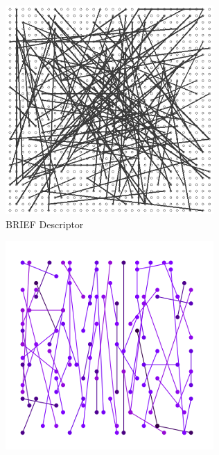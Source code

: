 \begin{figure}[htp]
  \centering
  \begin{subfigure}[t]{0.31\textwidth}
    \centering
    \includegraphics[width=\linewidth]{images/feature/brief.png}
    \caption{BRIEF Descriptor~\cite{Calonder2012}}
  \end{subfigure}
  \begin{subfigure}[t]{0.33\textwidth}
    \centering
    \includegraphics[width=\linewidth]{images/feature/orb.png}

\end{subfigure}
\end{figure}
